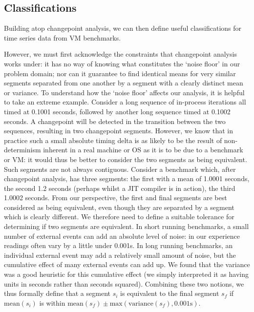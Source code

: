 \documentclass[acmsmall,screen]{acmart}
\begin{document}
\subsection{Classifications}
\label{sec:classifications}

Building atop changepoint analysis, we can then define useful classifications
for time series data from VM benchmarks.

However, we must first
acknowledge the constraints that changepoint analysis works under: it has
no way of knowing what constitutes the `noise floor' in our problem domain; nor can it
guarantee to find identical means for very similar segments separated from
one another by a segment with a clearly distinct mean or variance.
To understand how the `noise floor' affects our analysis, it
is helpful to take an extreme example. Consider a long sequence of in-process
iterations all timed at 0.1001 seconds, followed by another long sequence timed
at 0.1002 seconds. A changepoint will be detected in the transition between the
two sequences, resulting in two changepoint segments. However, we know that in practice such a small absolute timing
delta is as likely to be the result of non-determinism inherent in a real
machine or OS as it is to be due to a benchmark or VM: it would thus be
better to consider the two segments as being equivalent. Such segments
are not always contiguous. Consider a
benchmark which, after changepoint analysis, has three segments: the first with a
mean of 1.0001 seconds, the second 1.2 seconds (perhaps whilst a JIT compiler is
in action), the third 1.0002 seconds. From our perspective, the first and final
segments are best considered as being equivalent, even though they are separated by a
segment which is clearly different. We therefore need to define a suitable tolerance
for determining if two segments are equivalent. In short running benchmarks, a
small number of external events can add an absolute level of noise: in our
experience readings often vary by a
little under 0.001s. In long running benchmarks, an individual external
event may add a relatively small amount of noise, but the cumulative
effect of many external events can add up. We found that the variance was a good
heuristic for this cumulative effect (we simply interpreted it as having units
in seconds rather than seconds squared). Combining these two notions, we thus
formally define that a segment $s_i$
is equivalent to the final segment $s_f$ if $\textrm{mean}(s_i)$
is within $\textrm{mean}(s_f) \pm \textrm{max}(\textrm{variance}(s_f), 0.001\textrm{s})$.
\end{document}
